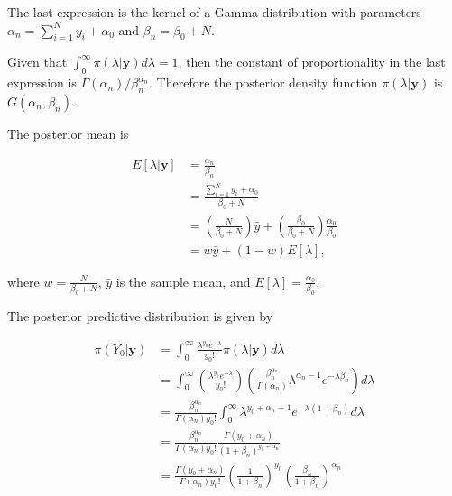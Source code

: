 \begin{enumerate}[leftmargin=*]
The last expression is the kernel of a Gamma distribution with parameters $\alpha_n = \sum_{i = 1}^{N} y_i + \alpha_0$ and $\beta_n = \beta_0 + N$.

Given that $\int_{0}^{\infty} \pi\left( \lambda | \textbf{y} \right) d\lambda = 1 $, then the constant of proportionality in the last expression is $\Gamma\left( \alpha_n\right) / \beta_n^{\alpha_n}$. Therefore the posterior density function $\pi\left(\lambda | \textbf{y}  \right)$ is $ G\left(\alpha_n, \beta_n \right)$.

The posterior mean is

\begin{align}
	E\left[ \lambda | \textbf{y}\right] & = \frac{\alpha_n}{\beta_n}  \\ 
	& = \frac{\sum_{i = 1}^{N} y_i + \alpha_0}{\beta_0 + N} \nonumber \\ 
	& = \left( \frac{N}{\beta_0 + N}\right) \bar{y} + \left( \frac{\beta_0}{\beta_0 + N}\right) \frac{\alpha_0}{\beta_0}  \nonumber \\
	& = w \bar{y} + \left( 1 - w \right) E\left[ \lambda \right], \nonumber 
\end{align}

where $w = \frac{N}{\beta_0 + N}$, $\bar{y}$ is the sample mean, and $E\left[ \lambda \right]  = \frac{\alpha_0}{\beta_0}$.

The posterior predictive distribution is given by

\begin{align}
	\pi\left(Y_0 | \textbf{y} \right) & = \int_{0}^{\infty} \frac{\lambda^{y_0} e^{-\lambda}}{y_0!} \pi\left(\lambda | \textbf{y}  \right) d \lambda\\
    & = \int_{0}^{\infty} \left( \frac{\lambda^{y_0} e^{-\lambda}}{y_0!} \right) \left( \frac{\beta_n^{\alpha_n}}{\Gamma(\alpha_n)} \lambda^{\alpha_n - 1} e^{-\lambda \beta_n} \right) d\lambda \nonumber \\
	& = \frac{\beta_n^{\alpha_n}}{\Gamma\left( \alpha_n\right) y_0 !} \int_{0}^{\infty} \lambda^{y_0 + \alpha_n - 1} e^{-\lambda \left( 1 + \beta_n\right)} d\lambda \nonumber \\
	& = \frac{\beta_n^{\alpha_n}}{\Gamma\left( \alpha_n\right) y_0 !} \frac{\Gamma\left( y_0 + \alpha_n \right) }{\left( 1 + \beta_n \right)^{y_0 + \alpha_n}} \nonumber\\
	& = \frac{\Gamma\left( y_0 + \alpha_n \right)}{\Gamma\left( \alpha_n \right) y_0 !} \left( \frac{1}{1 + \beta_n}\right)^{y_0} \left(\frac{\beta_n}{1 + \beta_n} \right)^{\alpha_n} \nonumber
\end{align}


\end{enumerate}
